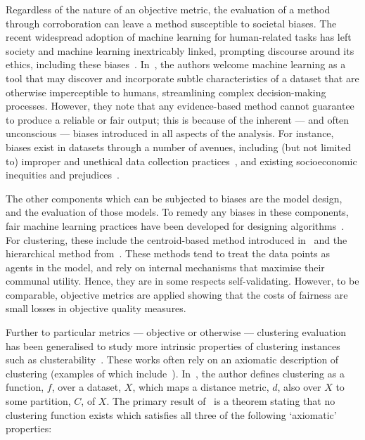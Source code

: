 Regardless of the nature of an objective metric, the evaluation of a method
through corroboration can leave a method susceptible to societal biases. The
recent widespread adoption of machine learning for human-related tasks has left
society and machine learning inextricably linked, prompting discourse around its
ethics, including these
biases~\cite{Barocas2019,Grote2020,Mehrabi2019,Obermeyer2019,Saltz2019}.
In~\cite{Barocas2019}, the authors welcome machine learning as a tool that may
discover and incorporate subtle characteristics of a dataset that are otherwise
imperceptible to humans, streamlining complex decision-making processes.
However, they note that any evidence-based method cannot guarantee to produce a
reliable or fair output; this is because of the inherent --- and often
unconscious --- biases introduced in all aspects of the analysis. For instance,
biases exist in datasets through a number of avenues, including (but not limited
to) improper and unethical data collection practices~\cite{Prabhu2020}, and
existing socioeconomic inequities and
prejudices~\cite{Crawford2013,Rangvid2019}.

The other components which can be subjected to biases are the model design, and
the evaluation of those models. To remedy any biases in these components, fair
machine learning practices have been developed for designing
algorithms~\cite{CorbettDavies2018,Friedler2016,Goelz2019,Kearns2017}. For
clustering, these include the centroid-based method introduced
in~\cite{Chen2019} and the hierarchical method from~\cite{Ahmadian2020}. These
methods tend to treat the data points as agents in the model, and rely on
internal mechanisms that maximise their communal utility. Hence, they are in
some respects self-validating. However, to be comparable, objective metrics are
applied showing that the costs of fairness are small losses in objective quality
measures.

Further to particular metrics --- objective or otherwise --- clustering
evaluation has been generalised to study more intrinsic properties of clustering
instances such as clusterability~\cite{Ackerman2009,Ostrovsky2006,Zhang2001}.
These works often rely on an axiomatic description of clustering (examples of
which include~\cite{Bezdek1978,Jardine1971,Kleinberg2002}).
In~\cite{Kleinberg2002}, the author defines clustering as a function, \(f\),
over a dataset, \(X\), which maps a distance metric, \(d\), also over \(X\) to
some partition, \(C\), of \(X\).
The primary result of~\cite{Kleinberg2002} is a theorem
stating that no clustering function exists which satisfies all three of the
following `axiomatic' properties: 


